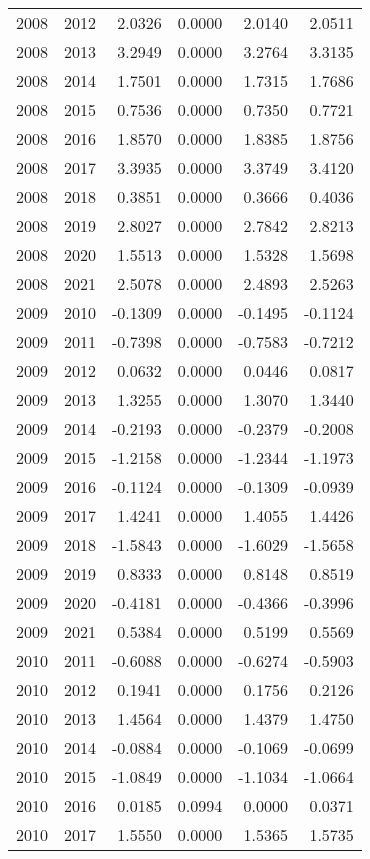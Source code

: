 \begin{tabular}{llrrrr}
2008 & 2012 & 2.0326 & 0.0000 & 2.0140 & 2.0511 \\
2008 & 2013 & 3.2949 & 0.0000 & 3.2764 & 3.3135 \\
2008 & 2014 & 1.7501 & 0.0000 & 1.7315 & 1.7686 \\
2008 & 2015 & 0.7536 & 0.0000 & 0.7350 & 0.7721 \\
2008 & 2016 & 1.8570 & 0.0000 & 1.8385 & 1.8756 \\
2008 & 2017 & 3.3935 & 0.0000 & 3.3749 & 3.4120 \\
2008 & 2018 & 0.3851 & 0.0000 & 0.3666 & 0.4036 \\
2008 & 2019 & 2.8027 & 0.0000 & 2.7842 & 2.8213 \\
2008 & 2020 & 1.5513 & 0.0000 & 1.5328 & 1.5698 \\
2008 & 2021 & 2.5078 & 0.0000 & 2.4893 & 2.5263 \\
2009 & 2010 & -0.1309 & 0.0000 & -0.1495 & -0.1124 \\
2009 & 2011 & -0.7398 & 0.0000 & -0.7583 & -0.7212 \\
2009 & 2012 & 0.0632 & 0.0000 & 0.0446 & 0.0817 \\
2009 & 2013 & 1.3255 & 0.0000 & 1.3070 & 1.3440 \\
2009 & 2014 & -0.2193 & 0.0000 & -0.2379 & -0.2008 \\
2009 & 2015 & -1.2158 & 0.0000 & -1.2344 & -1.1973 \\
2009 & 2016 & -0.1124 & 0.0000 & -0.1309 & -0.0939 \\
2009 & 2017 & 1.4241 & 0.0000 & 1.4055 & 1.4426 \\
2009 & 2018 & -1.5843 & 0.0000 & -1.6029 & -1.5658 \\
2009 & 2019 & 0.8333 & 0.0000 & 0.8148 & 0.8519 \\
2009 & 2020 & -0.4181 & 0.0000 & -0.4366 & -0.3996 \\
2009 & 2021 & 0.5384 & 0.0000 & 0.5199 & 0.5569 \\
2010 & 2011 & -0.6088 & 0.0000 & -0.6274 & -0.5903 \\
2010 & 2012 & 0.1941 & 0.0000 & 0.1756 & 0.2126 \\
2010 & 2013 & 1.4564 & 0.0000 & 1.4379 & 1.4750 \\
2010 & 2014 & -0.0884 & 0.0000 & -0.1069 & -0.0699 \\
2010 & 2015 & -1.0849 & 0.0000 & -1.1034 & -1.0664 \\
2010 & 2016 & 0.0185 & 0.0994 & 0.0000 & 0.0371 \\
2010 & 2017 & 1.5550 & 0.0000 & 1.5365 & 1.5735 \\

\end{tabular}
